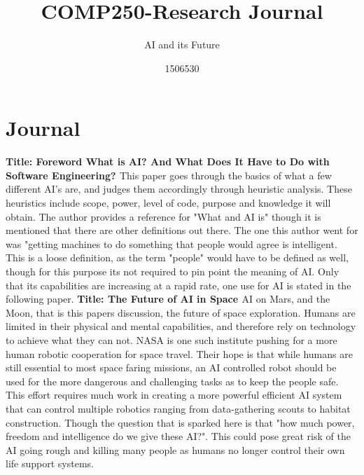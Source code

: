 \documentclass{scrartcl}
\title{COMP250-Research Journal}
\subtitle{AI and its Future}
\author{1506530}
\begin{document}
	
	
	\maketitle
	\section{Journal}
	
	\newline
	\newline
	\textbf{Title: Foreword What is AI? And What Does It Have to Do with Software Engineering? \cite{What}}
	\newline
This paper goes through the basics of what a few different AI's are, and judges them accordingly through heuristic analysis. These heuristics include scope, power, level of code, purpose and knowledge it will obtain. The author provides a reference for "What and AI is" though it is mentioned that there are other definitions out there. The one this author went for was "getting machines to do something that people would agree is intelligent. This is a loose definition, as the term "people" would have to be defined as well, though for this purpose its not required to pin point the meaning of AI. Only that its capabilities are increasing at a rapid rate, one use for AI is stated in the following paper.
	\newline
	\newline
	\newline
	\textbf{Title: The Future of AI in Space \cite{Space}}
	\newline
AI on Mars, and the Moon, that is this papers discussion, the future of space exploration. Humans are limited in their physical and mental capabilities, and therefore rely on technology to achieve what they can not. NASA is one such institute pushing for a more human robotic cooperation for space travel. Their hope is that while humans are still essential to most space faring missions, an AI controlled robot should be used for the more dangerous and challenging tasks as to keep the people safe. This effort requires much work in creating a more powerful efficient AI system that can control multiple robotics ranging from data-gathering scouts to habitat construction. Though the question that is sparked here is that "how much power, freedom and intelligence do we give these AI?". This could pose great risk of the AI going rough and killing many people as humans no longer control their own life support systems.
\end{document}
